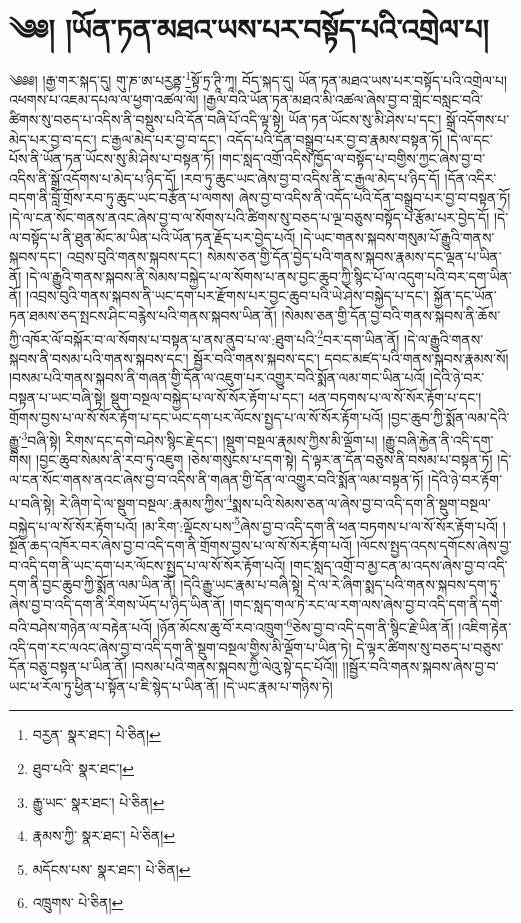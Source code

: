 \setcounter{footnote}{0} 
\chapter{༄༅། །ཡོན་ཏན་མཐའ་ཡས་པར་བསྟོད་པའི་འགྲེལ་པ།}༄༅༅། །རྒྱ་གར་སྐད་དུ། གུ་ཎ་ཨ་པརྱནྟ་\footnote{བརྱན་  སྣར་ཐང་།  པེ་ཅིན། }སྟོ་ཏྲ་ཊཱི་ཀཱ། བོད་སྐད་དུ། ཡོན་ཏན་མཐའ་ཡས་པར་བསྟོད་པའི་འགྲེལ་པ། འཕགས་པ་འཇམ་དཔལ་ལ་ཕྱག་འཚལ་ལོ། །རྒྱལ་བའི་ཡོན་ཏན་མཐའ་མི་འཚལ་ཞེས་བྱ་བ་གླེང་བསླང་བའི་ཚིགས་སུ་བཅད་པ་འདིས་ནི་བསྡུས་པའི་དོན་བཞི་པོ་འདི་ལྟ་སྟེ། ཡོན་ཏན་ཡོངས་སུ་མི་ཤེས་པ་དང་། སྒྲོ་འདོགས་པ་མེད་པར་བྱ་བ་དང་། ང་རྒྱལ་མེད་པར་བྱ་བ་དང་། འདོད་པའི་དོན་བསྒྲུབ་པར་བྱ་བ་རྣམས་བསྟན་ཏོ། །དེ་ལ་དང་པོས་ནི་ཡོན་ཏན་ཡོངས་སུ་མི་ཤེས་པ་བསྟན་ཏོ། །གང་སླད་འགྲོ་འདིས་ཁྱོད་ལ་བསྟོད་པ་བགྱིས་ཀྱང་ཞེས་བྱ་བ་འདིས་ནི་སྒྲོ་འདོགས་པ་མེད་པ་ཉིད་དོ། །རབ་ཏུ་ཆུང་ཡང་ཞེས་བྱ་བ་འདིས་ནི་ང་རྒྱལ་མེད་པ་ཉིད་དོ། །དོན་འདིར་བདག་ནི་བློ་གྲོས་རབ་ཏུ་ཆུང་ཡང་བརྩོན་པ་ལགས། ཞེས་བྱ་བ་འདིས་ནི་འདོད་པའི་དོན་བསྒྲུབ་པར་བྱ་བ་བསྟན་ཏོ། །དེ་ལ་ངན་སོང་གནས་ནའང་ཞེས་བྱ་བ་ལ་སོགས་པའི་ཚིགས་སུ་བཅད་པ་ལྔ་བཅུས་བསྟོད་པ་རྩོམ་པར་བྱེད་དོ། །དེ་ལ་བསྟོད་པ་ནི་ཐུན་མོང་མ་ཡིན་པའི་ཡོན་ཏན་རྗོད་པར་བྱེད་པའོ། །དེ་ཡང་གནས་སྐབས་གསུམ་པོ་རྒྱུའི་གནས་སྐབས་དང་། འབྲས་བུའི་གནས་སྐབས་དང་། སེམས་ཅན་གྱི་དོན་བྱེད་པའི་གནས་སྐབས་རྣམས་དང་ལྡན་པ་ཡིན་ནོ། །དེ་ལ་རྒྱུའི་གནས་སྐབས་ནི་སེམས་བསྐྱེད་པ་ལ་སོགས་པ་ནས་བྱང་ཆུབ་ཀྱི་སྙིང་པོ་ལ་འདུག་པའི་བར་དག་ཡིན་ནོ། །འབྲས་བུའི་གནས་སྐབས་ནི་ཡང་དག་པར་རྫོགས་པར་བྱང་ཆུབ་པའི་ཡེ་ཤེས་བསྐྱེད་པ་དང་། སྐྱོན་དང་ཡོན་ཏན་ཐམས་ཅད་སྤངས་ཤིང་བརྙེས་པའི་གནས་སྐབས་ཡིན་ནོ། །སེམས་ཅན་གྱི་དོན་བྱ་བའི་གནས་སྐབས་ནི་ཆོས་ཀྱི་འཁོར་ལོ་བསྐོར་བ་ལ་སོགས་པ་བསྟན་པ་ནས་ནུབ་པ་ལ་:ཐུག་པའི་\footnote{ཐུབ་པའི་  སྣར་ཐང་། }བར་དག་ཡིན་ནོ། །དེ་ལ་རྒྱུའི་གནས་སྐབས་ནི་བསམ་པའི་གནས་སྐབས་དང་། སྦྱོར་བའི་གནས་སྐབས་དང་། དབང་མཛད་པའི་གནས་སྐབས་རྣམས་སོ། །བསམ་པའི་གནས་སྐབས་ནི་གཞན་གྱི་དོན་ལ་འཇུག་པར་འགྱུར་བའི་སྨོན་ལམ་གང་ཡིན་པའོ། །དེའི་ཉེ་བར་བསྟན་པ་ཡང་བཞི་སྟེ། སྡུག་བསྔལ་བསྐྱེད་པ་ལ་སོ་སོར་རྟོག་པ་དང་། ཕན་བཏགས་པ་ལ་སོ་སོར་རྟོག་པ་དང་། གྲོགས་བྱས་པ་ལ་སོ་སོར་རྟོག་པ་དང་ཡང་དག་པར་ལོངས་སྤྱད་པ་ལ་སོ་སོར་རྟོག་པའོ། །བྱང་ཆུབ་ཀྱི་སྨོན་ལམ་དེའི་རྒྱུ་\footnote{རྒྱུ་ཡང་  སྣར་ཐང་།  པེ་ཅིན། }བཞི་སྟེ། རིགས་དང་དགེ་བཤེས་སྙིང་རྗེ་དང་། །སྡུག་བསྔལ་རྣམས་ཀྱིས་མི་ལྡོག་པ། །རྒྱུ་བཞི་རྐྱེན་ནི་འདི་དག་གིས། །བྱང་ཆུབ་སེམས་ནི་རབ་ཏུ་འཇུག །ཅེས་གསུངས་པ་དག་སྟེ། དེ་ལྟར་ན་དོན་བཅུས་ནི་བསམ་པ་བསྟན་ཏོ། །དེ་ལ་ངན་སོང་གནས་ནའང་ཞེས་བྱ་བ་འདིས་ནི་གཞན་གྱི་དོན་ལ་འགྱུར་བའི་སྨོན་ལམ་བསྟན་ཏོ། །དེའི་ཉེ་བར་རྟོག་པ་བཞི་སྟེ། རེ་ཞིག་དེ་ལ་སྡུག་བསྔལ་:རྣམས་ཀྱིས་\footnote{རྣམས་ཀྱི་  སྣར་ཐང་།  པེ་ཅིན། }སྨས་པའི་སེམས་ཅན་ལ་ཞེས་བྱ་བ་འདི་དག་ནི་སྡུག་བསྔལ་བསྐྱེད་པ་ལ་སོ་སོར་རྟོག་པའོ། །མ་རིག་:ལྡོངས་པས་\footnote{མདོངས་པས་  སྣར་ཐང་།  པེ་ཅིན། }ཞེས་བྱ་བ་འདི་དག་ནི་ཕན་བཏགས་པ་ལ་སོ་སོར་རྟོག་པའོ། །སྔོན་ཆད་འཁོར་བར་ཞེས་བྱ་བ་འདི་དག་ནི་གྲོགས་བྱས་པ་ལ་སོ་སོར་རྟོག་པའོ། །ལོངས་སྤྱད་འདས་དགོངས་ཞེས་བྱ་བ་འདི་དག་ནི་ཡང་དག་པར་ལོངས་སྤྱད་པ་ལ་སོ་སོར་རྟོག་པའོ། །གང་སླད་འགྲོ་བ་མྱ་ངན་མ་འདས་ཞེས་བྱ་བ་འདི་དག་ནི་བྱང་ཆུབ་ཀྱི་སྨོན་ལམ་ཡིན་ནོ། །དེའི་རྒྱུ་ཡང་རྣམ་པ་བཞི་སྟེ། དེ་ལ་རེ་ཞིག་སྨད་པའི་གནས་སྐབས་དག་ཏུ་ཞེས་བྱ་བ་འདི་དག་ནི་རིགས་ཡོད་པ་ཉིད་ཡིན་ནོ། །གང་སླད་གལ་ཏེ་རང་ལ་རག་ལས་ཞེས་བྱ་བ་འདི་དག་ནི་དགེ་བའི་བཤེས་གཉེན་ལ་བརྟེན་པའོ། །ཉོན་མོངས་ཆུ་བོ་རབ་འཁྲུག་\footnote{འཁྲུགས་  པེ་ཅིན། }ཅེས་བྱ་བ་འདི་དག་ནི་སྙིང་རྗེ་ཡིན་ནོ། །འཇིག་རྟེན་འདི་དག་རང་ལའང་ཞེས་བྱ་བ་འདི་དག་ནི་སྡུག་བསྔལ་གྱིས་མི་ལྡོག་པ་ཡིན་ཏེ། དེ་ལྟར་ཚིགས་སུ་བཅད་པ་བཅུས་དོན་བཅུ་བསྟན་པ་ཡིན་ནོ། །བསམ་པའི་གནས་སྐབས་ཀྱི་ལེའུ་སྟེ་དང་པོའོ།། །།སྦྱོར་བའི་གནས་སྐབས་ཞེས་བྱ་བ་ཡང་ཕ་རོལ་ཏུ་ཕྱིན་པ་སྟོན་པ་ཇི་སྙེད་པ་ཡིན་ནོ། །དེ་ཡང་རྣམ་པ་གཉིས་ཏེ། 